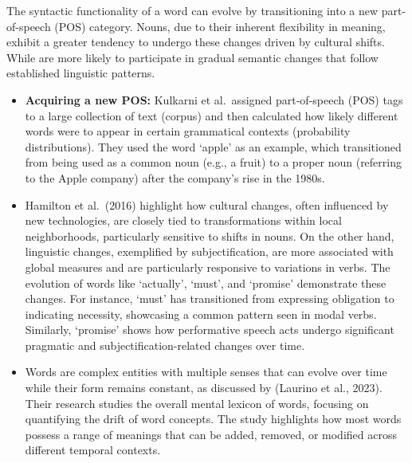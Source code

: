 The syntactic functionality of a word can evolve by transitioning into a new part-of-speech (POS) category.
Nouns, due to their inherent flexibility in meaning, exhibit a greater tendency to undergo these changes driven by cultural shifts.
While are more likely to participate in gradual semantic changes that follow established linguistic patterns.
\vspace{0mm}
\begin{itemize}
    \item \textbf{Acquiring a new POS:}
    Kulkarni et al.\ assigned part-of-speech (POS) tags to a large collection of text (corpus) and then calculated how likely different words were to appear in certain grammatical contexts (probability distributions).
    They used the word `apple' as an example, which transitioned from being used as a common noun (e.g., a fruit) to a proper noun (referring to the Apple company) after the company's rise in the 1980s.
    \item {}
     Hamilton et al.\ (2016) highlight how cultural changes, often influenced by new technologies, are closely tied to transformations within local neighborhoods, particularly sensitive to shifts in nouns.
     On the other hand, linguistic changes, exemplified by subjectification, are more associated with global measures and are particularly responsive to variations in verbs.
     The evolution of words like `actually', `must', and `promise' demonstrate these changes.
     For instance, `must' has transitioned from expressing obligation to indicating necessity, showcasing a common pattern seen in modal verbs.
     Similarly, `promise' shows how performative speech acts undergo significant pragmatic and subjectification-related changes over time.
    \item {}
    Words are complex entities with multiple senses that can evolve over time while their form remains constant, as discussed by (Laurino et al., 2023).
    Their research studies the overall mental lexicon of words, focusing on quantifying the drift of word concepts.
    The study highlights how most words possess a range of meanings that can be added, removed, or modified across different temporal contexts.
\end{itemize}


